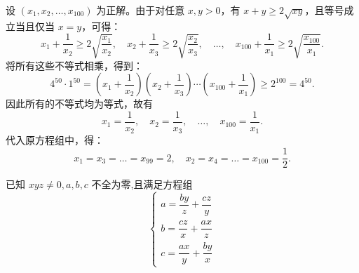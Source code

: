 \begin{questions}
\begin{solution}
设 $(x_1, x_2, \dots, x_{100})$ 为正解。由于对任意 $x, y > 0$，有 $x + y \geq 2\sqrt{xy}$，且等号成立当且仅当 $x = y$，可得：
\[
x_1 + \frac{1}{x_2} \geq 2\sqrt{\frac{x_1}{x_2}}, \quad x_2 + \frac{1}{x_3} \geq 2\sqrt{\frac{x_2}{x_3}}, \quad \dots, \quad x_{100} + \frac{1}{x_1} \geq 2\sqrt{\frac{x_{100}}{x_1}}.
\]
将所有这些不等式相乘，得到：
\[
4^{50} \cdot 1^{50} = \left( x_1 + \frac{1}{x_2} \right)\left( x_2 + \frac{1}{x_3} \right) \cdots \left( x_{100} + \frac{1}{x_1} \right) \geq 2^{100} = 4^{50}.
\]
因此所有的不等式均为等式，故有
\[
x_1 = \frac{1}{x_2}, \quad x_2 = \frac{1}{x_3}, \quad \dots, \quad x_{100} = \frac{1}{x_1}.
\]
代入原方程组中，得：
\[
x_1 = x_3 = \dots = x_{99} = 2, \quad x_2 = x_4 = \dots = x_{100} = \frac{1}{2}.
\]
\end{solution}

    \question 已知 $xyz \neq 0,a, b, c$ 不全为零,且满足方程组
    \[
    \begin{cases}
    a = \dfrac{by}{z} + \dfrac{cz}{y} \\[2mm]
    b = \dfrac{cz}{x} + \dfrac{ax}{z} \\[2mm]
    c = \dfrac{ax}{y} + \dfrac{by}{x}
    \end{cases}
    \]
\end{questions}
